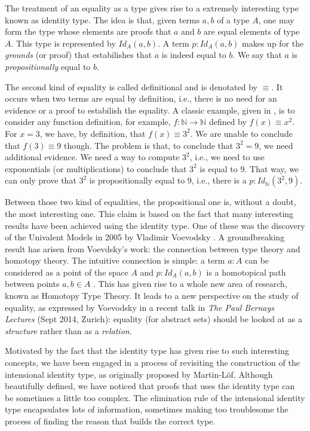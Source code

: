 \documentclass{entcs} \usepackage{entcsmacro}
\newcommand{\Nat}{{\mathbb N}}
\begin{document}
The treatment of an equality as a type gives rise to a extremely interesting type known as identity type. The idea is that, given terms $a, b$ of a type $A$, one may form the type whose elements are proofs that $a$ and $b$ are equal elements of type $A$. This type is represented by $Id_{A}(a,b)$. A term $p : Id_{A}(a,b)$ makes up for the {\em grounds\/} \cite{Prawitz2009} (or proof) that estabilishes that $a$ is indeed equal to $b$. We say that $a$ is {\em propositionally\/} equal to $b$.

 The second kind of equality is called definitional and is denotated by $\equiv$. It occurs when two terms are equal by definition, i.e., there is no need for an evidence or a proof to estabilish the equality. A classic example, given in \cite{hott}, is to consider any function definition, for example, $f: \Nat \rightarrow \Nat$ defined by $f(x) \equiv x^{2}$. For $x=3$, we have, by definition, that $f(x) \equiv 3^{2}$. We are unable to conclude that $f(3) \equiv 9$ though. The problem is that, to conclude that $3^2 = 9$, we need additional evidence. We need a way to compute $3^2$, i.e., we need to use exponentials (or multiplications) to conclude that $3^2$ is equal to $9$. That way, we can only prove that $3^2$ is propositionally equal to $9$, i.e., there is a $p : Id_{\Nat}(3^{2},9)$. 

Between those two kind of equalities, the propositional one is, without a doubt, the most interesting one. This claim is based on the fact that many interesting results have been achieved using the identity type. One of these was the discovery of the Univalent Models in 2005 by Vladimir Voevodsky \cite{Vlad1}. A groundbreaking result has arisen from Voevdsky's work: the connection between type theory and homotopy theory. The intuitive connection is simple: a term $a : A$ can be considered as a point of the space $A$ and $p: Id_{A}(a,b)$ is a homotopical path between points $a, b \in A$ \cite{hott}. This has given rise to a whole new area of research, known as Homotopy Type Theory. It leads to a new perspective on the study of equality, as expressed by Voevodsky in a recent talk in {\em The Paul Bernays Lectures\/} (Sept 2014, Zurich): equality (for abstract sets) should be looked at as a {\em structure\/} rather than as a {\em relation\/}. 

Motivated by the fact that the identity type has given rise to such interesting concepts, we have been engaged in a process of revisiting the construction of the intensional identity type, as originally proposed by Martin-L\"of. Although beautifully defined, we have noticed that proofs that uses the identity type can be sometimes a little too complex. The elimination rule of the intensional identity type encapsulates lots of information, sometimes making too troublesome the process of finding the reason that builds the correct type.
\end{document}
